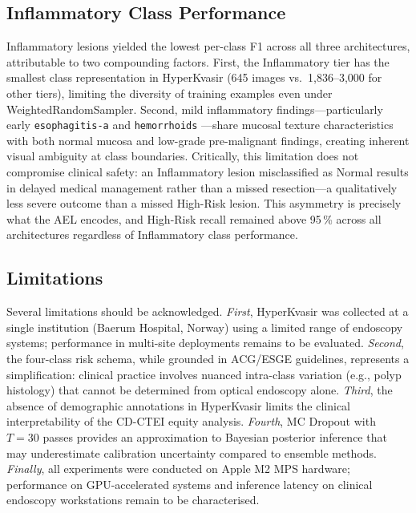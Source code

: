 \documentclass[10pt,a4paper,twocolumn]{article}
\begin{document}
\subsection{Inflammatory Class Performance}

Inflammatory lesions yielded the lowest per-class F1 across all three
architectures, attributable to two compounding factors. First, the
Inflammatory tier has the smallest class representation in HyperKvasir
(645 images vs.\ 1,836--3,000 for other tiers), limiting the diversity of
training examples even under WeightedRandomSampler. Second, mild inflammatory
findings---particularly early \texttt{esophagitis-a} and \texttt{hemorrhoids}
---share mucosal texture characteristics with both normal mucosa and low-grade
pre-malignant findings, creating inherent visual ambiguity at class boundaries.
Critically, this limitation does not compromise clinical safety: an
Inflammatory lesion misclassified as Normal results in delayed medical
management rather than a missed resection---a qualitatively less severe
outcome than a missed High-Risk lesion. This asymmetry is precisely what the
AEL encodes, and High-Risk recall remained above 95\,\% across all
architectures regardless of Inflammatory class performance.

\subsection{Limitations}

Several limitations should be acknowledged. \emph{First}, HyperKvasir was
collected at a single institution (Baerum Hospital, Norway) using a limited
range of endoscopy systems; performance in multi-site deployments remains to
be evaluated. \emph{Second}, the four-class risk schema, while grounded in
ACG/ESGE guidelines, represents a simplification: clinical practice involves
nuanced intra-class variation (e.g., polyp histology) that cannot be
determined from optical endoscopy alone. \emph{Third}, the absence of
demographic annotations in HyperKvasir limits the clinical interpretability
of the CD-CTEI equity analysis. \emph{Fourth}, MC Dropout with $T=30$ passes
provides an approximation to Bayesian posterior inference that may
underestimate calibration uncertainty compared to ensemble methods.
\emph{Finally}, all experiments were conducted on Apple M2 MPS hardware;
performance on GPU-accelerated systems and inference latency on clinical
endoscopy workstations remain to be characterised.

\end{document}
